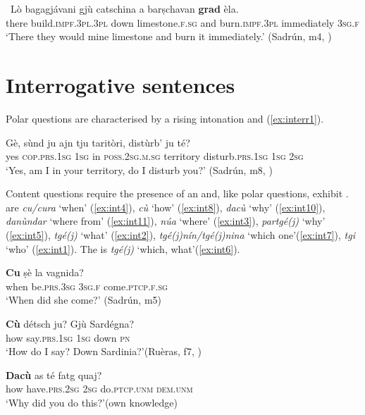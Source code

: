  
 \ea
 \
 \gll Lò bagagjávani gjù catschina a barṣchavan \textbf{grad} èla.   \\
 there build.\textsc{impf.3pl.3pl} down limestone.\textsc{f.sg} and  burn.\textsc{impf.3pl} immediately \textsc{3sg.f}\\
\glt `There they would mine limestone and burn it immediately.' (Sadrún, m4, \sectref{sec:8.3})
\z
 
 

\section{Interrogative sentences}\label{sec:5.2}
Polar questions are characterised by a rising intonation and  (\ref{ex:interr1}).

\ea
\label{ex:interr1}
\gll Gè, sùnd ju ajn tju taritòri, distùrb’ ju té?   \\
yes \textsc{cop.prs.1sg} \textsc{1sg} in \textsc{poss.2sg.m.sg} territory disturb.\textsc{prs.1sg} \textsc{1sg} \textsc{2sg} \\
\glt `Yes, am I in your territory, do I disturb you?' (Sadrún, m8, \sectref{sec:8.12})
\z

Content questions require the presence of an  and, like polar questions, exhibit .  are \textit{cu/cura} `when' (\ref{ex:int4}), \textit{cù} `how' (\ref{ex:int8}), \textit{dacù} `why' (\ref{ex:int10}), \textit{danùndar} `where from' (\ref{ex:int11}), \textit{núa} `where' (\ref{ex:int3}), \textit{partgé(j)} `why' (\ref{ex:int5}), \textit{tgé(j)} `what' (\ref{ex:int2}), \textit{tgé(j)nín/tgé(j)nina} `which one'(\ref{ex:int7}), \textit{tgi} `who' (\ref{ex:int1}). The  is \textit{tgé(j)} `which, what'(\ref{ex:int6}).

\ea
\label{ex:int4}
\gll \textbf{Cu} ṣè la vagnida?\\
when be.\textsc{prs.3sg} \textsc{3sg.f} come.\textsc{ptcp.f.sg}\\
\glt `When did she come?' (Sadrún, m5)
\z

\ea
\label{ex:int8}
\gll \textbf{Cù} détsch ju? Gjù Sardégna?\\
how say.\textsc{prs.1sg} \textsc{1sg} down \textsc{pn}\\
\glt `How do I say? Down Sardinia?'(Ruèras, f7, )
\z

\ea
\label{ex:int10}
\gll \textbf{Dacù} as té fatg quaj?\\
how have.\textsc{prs.2sg} \textsc{2sg} do.\textsc{ptcp.unm} \textsc{dem.unm}\\
\glt `Why did you do this?'(own knowledge)
\z

